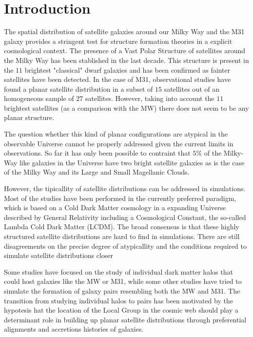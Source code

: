 \documentclass[a4paper,fleqn,usenatbib]{mnras}
\begin{document}
\section{Introduction}

The spatial distribution of satellite galaxies around our Milky Way and the
M31 galaxy provides a stringent test for structure formation theories
in a explicit cosmological context. 
The presence of a Vast Polar Structure of satellites around the Milky
Way has been stablished in the last decade.
This structure is present in the $11$ brightest "classical" dwarf
galaxies and has been confirmed as fainter satellites have been
detected. 
In the case of M31,  observational studies have found a planar satellite
distribution in a subset of $15$ satellites out of an homogeneous
sample of $27$ satellites. 
However, taking into account the $11$ brightest satellites (as a
comparison with the MW) there does not seem to be any planar structure.

The question whether this kind of planar configurations are atypical
in the observable Universe cannot be properly addressed given the
current limits in observations. 
So far it has only been possible to contraint that $5\%$ of the
Milky-Way like galaxies in the Universe have two bright satellite
galaxies as is the case of the Milky Way and its Large and Small
Magellanic Clouds. 

However, the tipicallity of satellite distributions can be addressed
in simulations.
Most of the studies have been performed in the currently preferred
paradigm, which is based on a Cold Dark Matter cosmology in a expanding
Universe described by General Relativity including a Cosmological
Constant, the so-called Lambda Cold Dark Matter (LCDM).
The broad consensus is that these highly structured satellite distributions
are hard to find in simulations.  
There are still disagreements on the precise degree of atypicallity
and the conditions required to simulate satellite distributions closer 

Some studies have focused on the study of individual dark matter halos
that could host galaxies like the MW or M31, while some other studies
have tried to simulate the formation of galaxy pairs resembling both
the MW and M31.
The transition from studying individual halos to pairs has been
motivated by the hypotesis hat the location of the Local Group in
the cosmic web should play a determinant role in building up planar
satellite distributions through preferential alignments and accretions
histories of galaxies.
\end{document}
